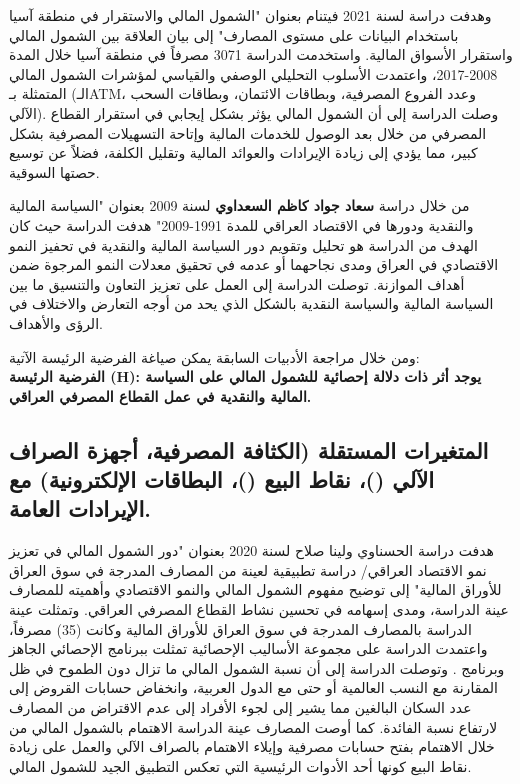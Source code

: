 \documentclass[10pt,a4paper]{report}
\begin{document}
\begin{doublespacing}
وهدفت دراسة \textbf{} لسنة 2021 فيتنام بعنوان "الشمول المالي والاستقرار في منطقة آسيا باستخدام البيانات على مستوى المصارف" إلى بيان العلاقة بين الشمول المالي واستقرار الأسواق المالية. واستخدمت الدراسة 3071 مصرفاً في منطقة آسيا خلال المدة 2008-2017، واعتمدت الأسلوب التحليلي الوصفي والقياسي لمؤشرات الشمول المالي المتمثلة بـ (الـATM، وعدد الفروع المصرفية، وبطاقات الائتمان، وبطاقات السحب الآلي). وصلت الدراسة إلى أن الشمول المالي يؤثر بشكل إيجابي في استقرار القطاع المصرفي من خلال بعد الوصول للخدمات المالية وإتاحة التسهيلات المصرفية بشكل كبير، مما يؤدي إلى زيادة الإيرادات والعوائد المالية وتقليل الكلفة، فضلاً عن توسيع حصتها السوقية.

من خلال دراسة \textbf{سعاد جواد كاظم السعداوي} لسنة 2009 بعنوان "السياسة المالية والنقدية ودورها في الاقتصاد العراقي للمدة 1991-2009" هدفت الدراسة حيث كان الهدف من الدراسة هو تحليل وتقويم دور السياسة المالية والنقدية في تحفيز النمو الاقتصادي في العراق ومدى نجاحهما أو عدمه في تحقيق معدلات النمو المرجوة ضمن أهداف الموازنة. توصلت الدراسة إلى العمل على تعزيز التعاون والتنسيق ما بين السياسة المالية والسياسة النقدية بالشكل الذي يحد من أوجه التعارض والاختلاف في الرؤى والأهداف.

ومن خلال مراجعة الأدبيات السابقة يمكن صياغة الفرضية الرئيسة الآتية:\\
\textbf{الفرضية الرئيسة (H): يوجد أثر ذات دلالة إحصائية للشمول المالي على السياسة المالية والنقدية في عمل القطاع المصرفي العراقي.}
\subsection{المتغيرات المستقلة ({الكثافة المصرفية}، {أجهزة الصراف الآلي} ()، {نقاط البيع} ()، {البطاقات الإلكترونية}) مع الإيرادات العامة.
}
هدفت دراسة {الحسناوي ولينا صلاح} لسنة 2020 بعنوان "دور الشمول المالي في تعزيز نمو الاقتصاد العراقي/ دراسة تطبيقية لعينة من المصارف المدرجة في سوق العراق للأوراق المالية" إلى توضيح مفهوم الشمول المالي والنمو الاقتصادي وأهميته للمصارف عينة الدراسة، ومدى إسهامه في تحسين نشاط القطاع المصرفي العراقي. وتمثلت عينة الدراسة بالمصارف المدرجة في سوق العراق للأوراق المالية وكانت (35) مصرفاً، واعتمدت الدراسة على مجموعة الأساليب الإحصائية تمثلت ببرنامج  الإحصائي الجاهز وبرنامج . وتوصلت الدراسة إلى أن نسبة الشمول المالي ما تزال دون الطموح في ظل المقارنة مع النسب العالمية أو حتى مع الدول العربية، وانخفاض حسابات القروض إلى عدد السكان البالغين مما يشير إلى لجوء الأفراد إلى عدم الاقتراض من المصارف لارتفاع نسبة الفائدة. كما أوصت المصارف عينة الدراسة الاهتمام بالشمول المالي من خلال الاهتمام بفتح حسابات مصرفية وإيلاء الاهتمام بالصراف الآلي والعمل على زيادة نقاط البيع كونها أحد الأدوات الرئيسية التي تعكس التطبيق الجيد للشمول المالي.


\end{doublespacing}
\end{document}
